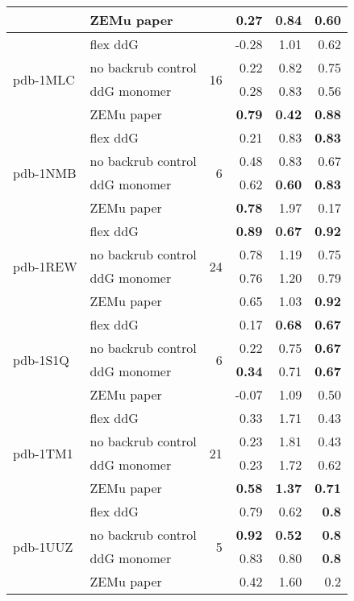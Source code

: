{\begin{longtable}{llrrrr}
 & ZEMu paper & & 0.27 & 0.84 & 0.60  \\
\hline
 \multirow{ 4}{*}{pdb-1MLC} & flex ddG & \multirow{ 4}{*}{16} & -0.28 & 1.01 & 0.62  \\
 & no backrub control & & 0.22 & 0.82 & 0.75  \\
 & ddG monomer & & 0.28 & 0.83 & 0.56  \\
 & ZEMu paper & & \textbf{0.79} & \textbf{0.42} & \textbf{0.88}  \\
\hline
 \multirow{ 4}{*}{pdb-1NMB} & flex ddG & \multirow{ 4}{*}{6} & 0.21 & 0.83 & \textbf{0.83}  \\
 & no backrub control & & 0.48 & 0.83 & 0.67  \\
 & ddG monomer & & 0.62 & \textbf{0.60} & \textbf{0.83}  \\
 & ZEMu paper & & \textbf{0.78} & 1.97 & 0.17  \\
\hline
 \multirow{ 4}{*}{pdb-1REW} & flex ddG & \multirow{ 4}{*}{24} & \textbf{0.89} & \textbf{0.67} & \textbf{0.92}  \\
 & no backrub control & & 0.78 & 1.19 & 0.75  \\
 & ddG monomer & & 0.76 & 1.20 & 0.79  \\
 & ZEMu paper & & 0.65 & 1.03 & \textbf{0.92}  \\
\hline
 \multirow{ 4}{*}{pdb-1S1Q} & flex ddG & \multirow{ 4}{*}{6} & 0.17 & \textbf{0.68} & \textbf{0.67}  \\
 & no backrub control & & 0.22 & 0.75 & \textbf{0.67}  \\
 & ddG monomer & & \textbf{0.34} & 0.71 & \textbf{0.67}  \\
 & ZEMu paper & & -0.07 & 1.09 & 0.50  \\
\hline
 \multirow{ 4}{*}{pdb-1TM1} & flex ddG & \multirow{ 4}{*}{21} & 0.33 & 1.71 & 0.43  \\
 & no backrub control & & 0.23 & 1.81 & 0.43  \\
 & ddG monomer & & 0.23 & 1.72 & 0.62  \\
 & ZEMu paper & & \textbf{0.58} & \textbf{1.37} & \textbf{0.71}  \\
\hline
 \multirow{ 4}{*}{pdb-1UUZ} & flex ddG & \multirow{ 4}{*}{5} & 0.79 & 0.62 & \textbf{0.8}  \\
 & no backrub control & & \textbf{0.92} & \textbf{0.52} & \textbf{0.8}  \\
 & ddG monomer & & 0.83 & 0.80 & \textbf{0.8}  \\
 & ZEMu paper & & 0.42 & 1.60 & 0.2  \\

\end{longtable}}
